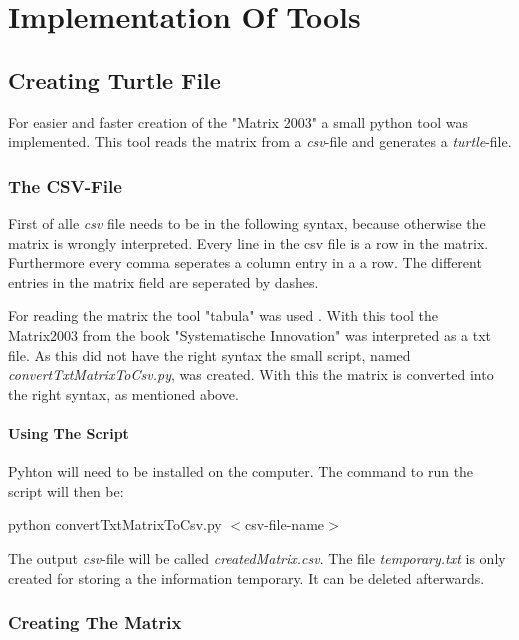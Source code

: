 \section{Implementation Of Tools}

\subsection{Creating Turtle File}

For easier and faster creation of the "Matrix 2003" a small python tool was implemented.
This tool reads the matrix from a \textit{csv}-file and generates a \textit{turtle}-file.

\subsubsection{The CSV-File}

First of alle \textit{csv} file needs to be in the following syntax, because otherwise the matrix is wrongly interpreted.
Every line in the csv file is a row in the matrix.
Furthermore every comma seperates a column entry in a a row.
The different entries in the matrix field are seperated by dashes.

For reading the matrix the tool "tabula" was used \cite{tabula}.
With this tool the Matrix2003 from the book "Systematische Innovation" was interpreted as a txt file.
As this did not have the right syntax the small script, named \textit{convertTxtMatrixToCsv.py}, was created. 
With this the matrix is converted into the right syntax, as mentioned above.

\paragraph{Using The Script}

Pyhton will need to be installed on the computer. 
The command to run the script will then be:

\begin{center}
    python convertTxtMatrixToCsv.py $<$csv-file-name$>$
\end{center}

The output \textit{csv}-file will be called \textit{createdMatrix.csv}.
The file \textit{temporary.txt} is only created for storing a the information temporary. 
It can be deleted afterwards.

\subsubsection{Creating The Matrix}

